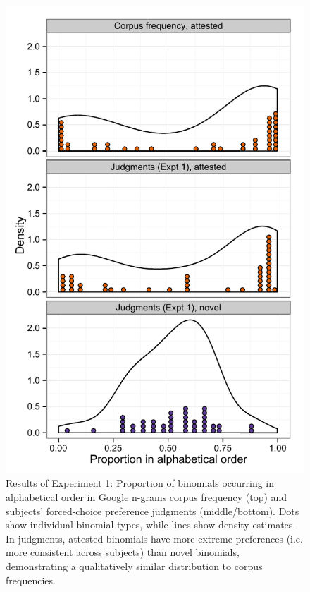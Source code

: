 \documentclass[authoryear]{elsarticle}
\begin{document}
\begin{figure}[t]
\centering
\includegraphics[scale=0.8]{just-judge-density-vertical.pdf}
\caption{Results of Experiment 1: Proportion of binomials occurring in alphabetical order in Google n-grams corpus frequency (top) and subjects' forced-choice preference judgments (middle/bottom). Dots show individual binomial types, while lines show density estimates. In judgments, attested binomials have more extreme preferences (i.e. more consistent across subjects) than novel binomials, demonstrating a qualitatively similar distribution to corpus frequencies.} \label{fig:judge}
\end{figure}
\end{document}
